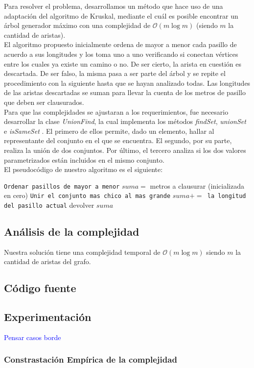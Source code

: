 Para resolver el problema, desarrollamos un método que hace uso de una adaptación del algoritmo de Kruskal, mediante el cuál es posible encontrar un árbol generador máximo con una complejidad de $\mathcal{O}(m\log{}m)$ (siendo $m$ la cantidad de aristas).\\
El algoritmo propuesto inicialmente ordena de mayor a menor cada pasillo de acuerdo a sus longitudes y los toma uno a uno verificando si conectan vértices entre los cuales ya existe un camino o no. De ser cierto, la arista en cuestión es descartada. De ser falso, la misma pasa a ser parte del árbol y se repite el procedimiento con la siguiente hasta que se hayan analizado todas. Las longitudes de las aristas descartadas se suman para llevar la cuenta de los metros de pasillo que deben ser clausurados.\\
Para que las complejidades se ajustaran a los requerimientos, fue necesario desarrollar la clase \textit{UnionFind}, la cual implementa los métodos \textit{findSet}, \textit{unionSet} e \textit{isSameSet} . El primero de ellos permite, dado un elemento, hallar al representante del conjunto en el que se encuentra. El segundo, por su parte, realiza la unión de dos conjuntos. Por último, el tercero analiza si los dos valores parametrizados están incluidos en el mismo conjunto. \\

El pseudocódigo de nuestro algoritmo es el siguiente:

\begin{algorithmic} 

\STATE \texttt{Ordenar pasillos de mayor a menor}
\STATE $suma = $ metros a clausurar (inicializada en cero)
		\STATE \texttt{Unir el conjunto mas chico al mas grande}
	\ELSE
		\STATE \texttt{$suma += $ la longitud del pasillo actual}
	\ENDIF
\ENDFOR
\STATE devolver $suma$
\end{algorithmic} 


\subsection{Análisis de la complejidad}
Nuestra solución tiene una complejidad temporal de $\mathcal{O}(m\log{}m)$ siendo $m$ la cantidad de aristas del grafo. \\
\subsection{Código fuente}

\subsection{Experimentación}
\textcolor{blue}{Pensar casos borde}

\subsubsection{Constrastación Empírica de la complejidad}
